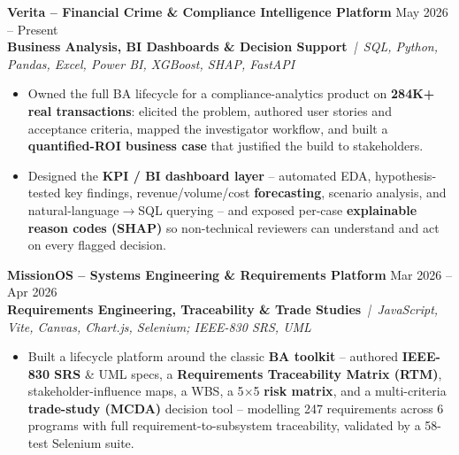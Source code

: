 \documentclass[a4paper,10pt]{article}
\newcommand{\projectEntry}[4]{%
  \vspace{1pt}%
  \noindent\textbf{\color{HeaderDark}#1} \hfill {\small\color{SubText}#2}\\[-4pt]%
  {\scriptsize\color{AccentTeal}\textbf{#3}} {\scriptsize\color{TechTag}\textit{\,|\, #4}}%
  \vspace{0pt}\par%
}
\begin{document}
\vspace{1pt}

\projectEntry{Verita -- Financial Crime \& Compliance Intelligence Platform}
  {May 2026 -- Present}
  {Business Analysis, BI Dashboards \& Decision Support}
  {SQL, Python, Pandas, Excel, Power BI, XGBoost, SHAP, FastAPI}

\begin{itemize}[leftmargin=14pt, itemsep=0pt, parsep=0pt, topsep=1pt, label={\color{BulletColor}\textbf{--}}]
  \item {\small Owned the full BA lifecycle for a compliance-analytics product on \textbf{284K+ real transactions}: elicited the problem, authored user stories and acceptance criteria, mapped the investigator workflow, and built a \textbf{quantified-ROI business case} that justified the build to stakeholders.}
  \item {\small Designed the \textbf{KPI / BI dashboard layer} -- automated EDA, hypothesis-tested key findings, revenue/volume/cost \textbf{forecasting}, scenario analysis, and natural-language$\rightarrow$SQL querying -- and exposed per-case \textbf{explainable reason codes (SHAP)} so non-technical reviewers can understand and act on every flagged decision.}
\end{itemize}

\vspace{1pt}

\projectEntry{MissionOS -- Systems Engineering \& Requirements Platform}
  {Mar 2026 -- Apr 2026}
  {Requirements Engineering, Traceability \& Trade Studies}
  {JavaScript, Vite, Canvas, Chart.js, Selenium; IEEE-830 SRS, UML}

\begin{itemize}[leftmargin=14pt, itemsep=0pt, parsep=0pt, topsep=1pt, label={\color{BulletColor}\textbf{--}}]
  \item {\small Built a lifecycle platform around the classic \textbf{BA toolkit} -- authored \textbf{IEEE-830 SRS} \& UML specs, a \textbf{Requirements Traceability Matrix (RTM)}, stakeholder-influence maps, a WBS, a 5$\times$5 \textbf{risk matrix}, and a multi-criteria \textbf{trade-study (MCDA)} decision tool -- modelling 247 requirements across 6 programs with full requirement-to-subsystem traceability, validated by a 58-test Selenium suite.}
\end{itemize}

\vspace{1pt}
\end{document}
